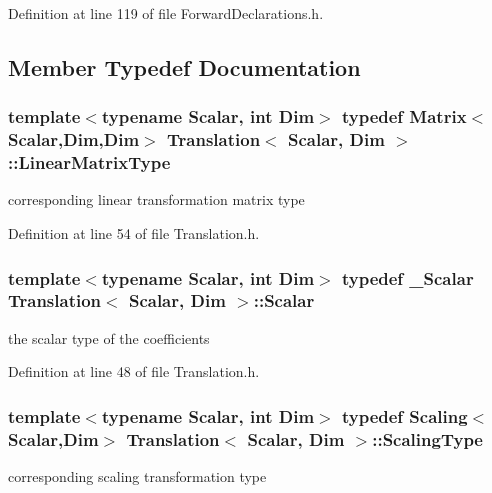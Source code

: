 Definition at line 119 of file Forward\-Declarations.\-h.



\subsection{Member Typedef Documentation}
\hypertarget{class_translation_a4e4dc4e17b8a4d243682fa2d9bbeaa38}{
\subsubsection[{Linear\-Matrix\-Type}]{\setlength{\rightskip}{0pt plus 5cm}template$<$typename Scalar, int Dim$>$ typedef {\bf Matrix}$<${\bf Scalar},Dim,Dim$>$ {\bf Translation}$<$ {\bf Scalar}, Dim $>$\-::{\bf Linear\-Matrix\-Type}}}\label{class_translation_a4e4dc4e17b8a4d243682fa2d9bbeaa38}
corresponding linear transformation matrix type 

Definition at line 54 of file Translation.\-h.

\hypertarget{class_translation_a3ac09e6bdde38180bd4144846e760226}{
\subsubsection[{Scalar}]{\setlength{\rightskip}{0pt plus 5cm}template$<$typename Scalar, int Dim$>$ typedef \-\_\-\-Scalar {\bf Translation}$<$ {\bf Scalar}, Dim $>$\-::{\bf Scalar}}}\label{class_translation_a3ac09e6bdde38180bd4144846e760226}
the scalar type of the coefficients 

Definition at line 48 of file Translation.\-h.

\hypertarget{class_translation_ae1c92ee9e56b88d3355c9551b171279f}{
\subsubsection[{Scaling\-Type}]{\setlength{\rightskip}{0pt plus 5cm}template$<$typename Scalar, int Dim$>$ typedef {\bf Scaling}$<${\bf Scalar},Dim$>$ {\bf Translation}$<$ {\bf Scalar}, Dim $>$\-::{\bf Scaling\-Type}}}\label{class_translation_ae1c92ee9e56b88d3355c9551b171279f}
corresponding scaling transformation type 

